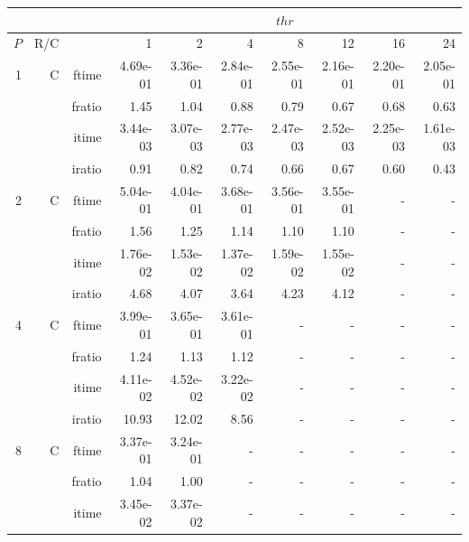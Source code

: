 \documentclass[a4paper]{article}
\begin{document}
\begin{table}[htbp]
\begin{center}
\begin{small}
\begin{tabular}{|r|r|r|r|r|r|r|r|r|r|}
\hline 
     & & & \multicolumn{7}{c|}{$thr$} \\ \hline
    $P$ & R/C &  & 1           & 2    & 4    & 8    & 12   & 16    & 24  \\ \hline\hline
     1 & C & ftime & 4.69e-01 & 3.36e-01 & 2.84e-01 & 2.55e-01 & 2.16e-01 & 2.20e-01 & 2.05e-01 \\   
          &      & fratio & 1.45 & 1.04 & 0.88 & 0.79 & 0.67 & 0.68 & 0.63 \\   
          &      & itime & 3.44e-03 & 3.07e-03 & 2.77e-03 & 2.47e-03 & 2.52e-03 & 2.25e-03 & 1.61e-03 \\   
          &      & iratio & 0.91 & 0.82 & 0.74 & 0.66 & 0.67 & 0.60 & 0.43 \\ \hline 
     2 & C & ftime & 5.04e-01 & 4.04e-01 & 3.68e-01 & 3.56e-01 & 3.55e-01 &     -     &     -     \\   
          &      & fratio & 1.56 & 1.25 & 1.14 & 1.10 & 1.10 &     -     &     -     \\   
          &      & itime & 1.76e-02 & 1.53e-02 & 1.37e-02 & 1.59e-02 & 1.55e-02 &     -     &     -     \\   
          &      & iratio & 4.68 & 4.07 & 3.64 & 4.23 & 4.12 &     -     &     -     \\ \hline 
     4 & C & ftime & 3.99e-01 & 3.65e-01 & 3.61e-01 &     -     &     -     &     -     &     -     \\   
          &      & fratio & 1.24 & 1.13 & 1.12 &     -     &     -     &     -     &     -     \\   
          &      & itime & 4.11e-02 & 4.52e-02 & 3.22e-02 &     -     &     -     &     -     &     -     \\   
          &      & iratio & 10.93 & 12.02 & 8.56 &     -     &     -     &     -     &     -     \\ \hline 
     8 & C & ftime & 3.37e-01 & 3.24e-01 &     -     &     -     &     -     &     -     &     -     \\   
          &      & fratio & 1.04 & 1.00 &     -     &     -     &     -     &     -     &     -     \\   
          &      & itime & 3.45e-02 & 3.37e-02 &     -     &     -     &     -     &     -     &     -     \\   

\end{tabular}
\end{small}
\end{center}
\end{table}
\end{document}
